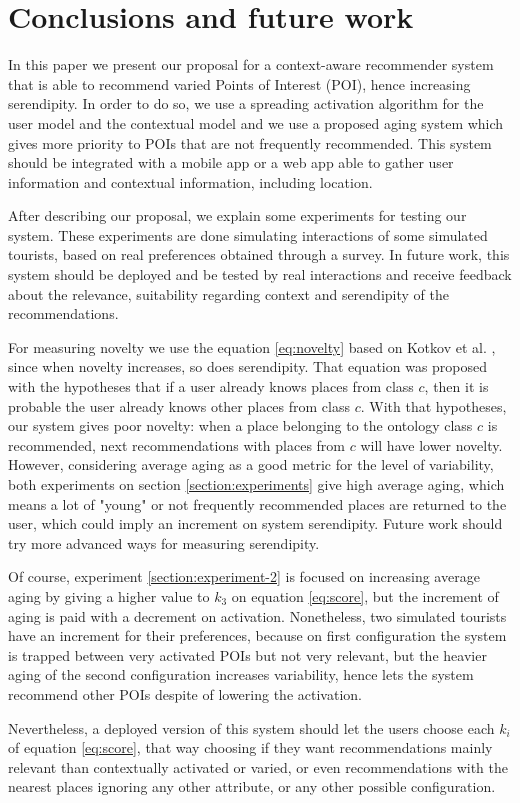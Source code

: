\section{Conclusions and future work} \label{section:conclu}

In this paper we present our proposal for a context-aware recommender system that is able to recommend varied Points of Interest (POI), hence increasing serendipity. In order to do so, we use a spreading activation algorithm for the user model and the contextual model and we use a proposed aging system which gives more priority to POIs that are not frequently recommended. This system should be integrated with a mobile app or a web app able to gather user information and contextual information, including location.

After describing our proposal, we explain some experiments for testing our system. These experiments are done simulating interactions of some simulated tourists, based on real preferences obtained through a survey. In future work, this system should be deployed and be tested by real interactions and receive feedback about the relevance, suitability regarding context and serendipity of the recommendations.

For measuring novelty we use the equation \ref{eq:novelty} based on Kotkov et al. \cite{kotkov2016survey}, since when novelty increases, so does serendipity. That equation was proposed with the hypotheses that if a user already knows places from class $c$, then it is probable the user already knows other places from class $c$. With that hypotheses, our system gives poor novelty: when a place belonging to the ontology class $c$ is recommended, next recommendations with places from $c$ will have lower novelty. However, considering average aging as a good metric for the level of variability, both experiments on section \ref{section:experiments} give high average aging, which means a lot of "young" or not frequently recommended places are returned to the user, which could imply an increment on system serendipity. Future work should try more advanced ways for measuring serendipity.

Of course, experiment \ref{section:experiment-2} is focused on increasing average aging by giving a higher value to $k_3$ on equation \ref{eq:score}, but the increment of aging is paid with a decrement on activation. Nonetheless, two simulated tourists have an increment for their preferences, because on first configuration the system is trapped between very activated POIs but not very relevant, but the heavier aging of the second configuration increases variability, hence lets the system recommend other POIs despite of lowering the activation. 

Nevertheless, a deployed version of this system should let the users choose each $k_i$ of equation \ref{eq:score}, that way choosing if they want recommendations mainly relevant than contextually activated or varied, or even recommendations with the nearest places ignoring any other attribute, or any other possible configuration.